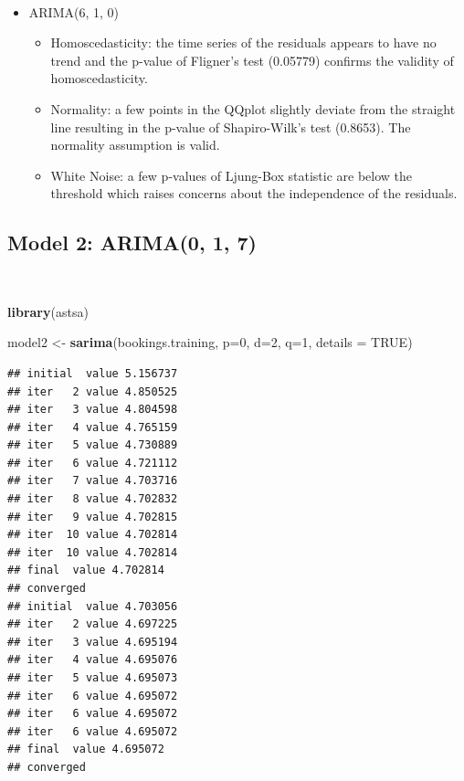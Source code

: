 \documentclass[]{article}
\newenvironment{Shaded}{\begin{snugshade}}{\end{snugshade}}
\newcommand{\DataTypeTok}[1]{\textcolor[rgb]{0.13,0.29,0.53}{#1}}
\newcommand{\DecValTok}[1]{\textcolor[rgb]{0.00,0.00,0.81}{#1}}
\newcommand{\KeywordTok}[1]{\textcolor[rgb]{0.13,0.29,0.53}{\textbf{#1}}}
\newcommand{\NormalTok}[1]{#1}
\newcommand{\OtherTok}[1]{\textcolor[rgb]{0.56,0.35,0.01}{#1}}
\newcommand{\StringTok}[1]{\textcolor[rgb]{0.31,0.60,0.02}{#1}}
\providecommand{\tightlist}{%
  \setlength{\itemsep}{0pt}\setlength{\parskip}{0pt}}
\begin{document}
\(\;\)

\begin{itemize}
\tightlist
\item
  ARIMA(6, 1, 0)

  \begin{itemize}
  \tightlist
  \item
    Homoscedasticity: the time series of the residuals appears to have
    no trend and the p-value of Fligner's test (0.05779) confirms the
    validity of homoscedasticity.
  \item
    Normality: a few points in the QQplot slightly deviate from the
    straight line resulting in the p-value of Shapiro-Wilk's test
    (0.8653). The normality assumption is valid.
  \item
    White Noise: a few p-values of Ljung-Box statistic are below the
    threshold which raises concerns about the independence of the
    residuals.
  \end{itemize}
\end{itemize}

\newpage

\hypertarget{model-2-arima0-1-7}{%
\subsection{Model 2: ARIMA(0, 1, 7)}\label{model-2-arima0-1-7}}

\(\;\)

\begin{Shaded}
\begin{Highlighting}[]
\KeywordTok{library}\NormalTok{(astsa)}

\NormalTok{model2 <-}\StringTok{ }\KeywordTok{sarima}\NormalTok{(bookings.training, }\DataTypeTok{p=}\DecValTok{0}\NormalTok{, }\DataTypeTok{d=}\DecValTok{2}\NormalTok{, }\DataTypeTok{q=}\DecValTok{1}\NormalTok{, }\DataTypeTok{details =} \OtherTok{TRUE}\NormalTok{)}
\end{Highlighting}
\end{Shaded}

\begin{verbatim}
## initial  value 5.156737 
## iter   2 value 4.850525
## iter   3 value 4.804598
## iter   4 value 4.765159
## iter   5 value 4.730889
## iter   6 value 4.721112
## iter   7 value 4.703716
## iter   8 value 4.702832
## iter   9 value 4.702815
## iter  10 value 4.702814
## iter  10 value 4.702814
## final  value 4.702814 
## converged
## initial  value 4.703056 
## iter   2 value 4.697225
## iter   3 value 4.695194
## iter   4 value 4.695076
## iter   5 value 4.695073
## iter   6 value 4.695072
## iter   6 value 4.695072
## iter   6 value 4.695072
## final  value 4.695072 
## converged
\end{verbatim}
\end{document}
